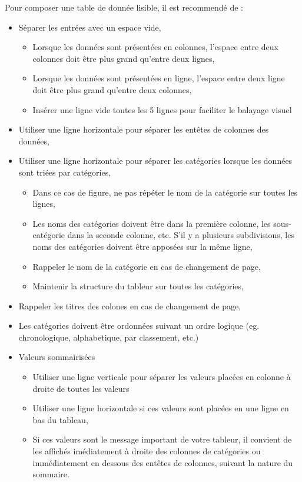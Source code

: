 \documentclass[11pt]{article}
\begin{document}
Pour composer une table de donnée lisible, il est recommendé de :
\begin{itemize}
\item Séparer les entrées avec un espace vide,
\begin{itemize}
\item Lorsque les données sont présentées en colonnes, l'espace entre deux colonnes doit être plus grand qu'entre deux lignes,
\item Lorsque les données sont présentées en ligne, l'espace entre deux ligne doit être plus grand qu'entre deux colonnes,
\item Insérer une ligne vide toutes les 5 lignes pour faciliter le balayage visuel \autocite[9241-125:2018]{ISO}
\end{itemize}
\item Utiliser une ligne horizontale pour séparer les entêtes de colonnes des données,
\item Utiliser une ligne horizontale pour séparer les catégories lorsque les données sont triées par catégories,
\begin{itemize}
\item Dans ce cas de figure, ne pas répéter le nom de la catégorie sur toutes les lignes,
\item Les noms des catégories doivent être dans la première colonne, les sous-catégorie dans la seconde colonne, etc. S'il y a plusieurs subdivisions, les noms des catégories doivent être apposées sur la même ligne,
\item Rappeler le nom de la catégorie en cas de changement de page,
\item Maintenir la structure du tableur sur toutes les catégories,
\end{itemize}
\item Rappeler les titres des colones en cas de changement de page,
\item Les catégories doivent être ordonnées suivant un ordre logique (eg. chronologique, alphabetique, par classement, etc.)
\item Valeurs sommairisées
\begin{itemize}
\item Utiliser une ligne verticale pour séparer les valeurs placées en colonne à droite de toutes les valeurs
\item Utiliser une ligne horizontale si ces valeurs sont placées en une ligne en bas du tableau,
\item Si ces valeurs sont le message important de votre tableur, il convient de les affichés imédiatement à droite des colonnes de catégories ou immédiatement en dessous des entêtes de colonnes, suivant la nature du sommaire.

\end{itemize}
\end{itemize}
\end{document}
